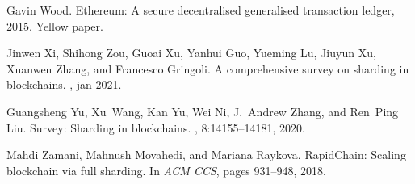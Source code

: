 \documentclass[11pt,dvipdfm]{article}
\begin{document}
\begin{thebibliography}{10}
Gavin Wood.
\newblock Ethereum: A secure decentralised generalised transaction ledger,
  2015.
\newblock Yellow paper.

Jinwen Xi, Shihong Zou, Guoai Xu, Yanhui Guo, Yueming Lu, Jiuyun Xu, Xuanwen
  Zhang, and Francesco Gringoli.
\newblock A comprehensive survey on sharding in blockchains.
, jan 2021.

Guangsheng Yu, Xu~Wang, Kan Yu, Wei Ni, J.~Andrew Zhang, and Ren~Ping Liu.
\newblock Survey: Sharding in blockchains.
, 8:14155--14181, 2020.

Mahdi Zamani, Mahnush Movahedi, and Mariana Raykova.
\newblock Rapid{C}hain: Scaling blockchain via full sharding.
\newblock In {\em ACM CCS}, pages 931--948, 2018.

\end{thebibliography}

%
%
\end{document}
